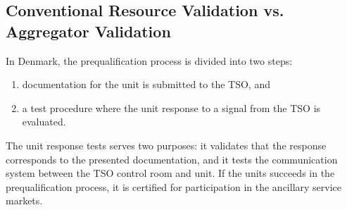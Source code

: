 \subsection{Conventional Resource Validation vs. Aggregator Validation}\label{subsec:backgroundvalidation}
In Denmark, the prequalification process is divided into two steps:
\begin{enumerate}
	\item documentation for the unit is submitted to the TSO, and
	\item a test procedure where the unit response to a signal from the TSO is evaluated.
\end{enumerate}

The unit response tests serves two purposes: it validates that the response corresponds to the presented documentation, and it tests the communication system between the TSO control room and unit. If the units succeeds in the prequalification process, it is certified for participation in the ancillary service markets.

